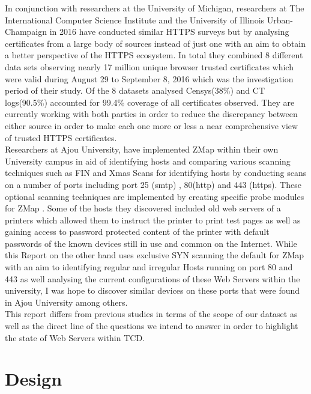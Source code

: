 \documentclass[a4wide,leqno,12pt]{report}
\begin{document}
In conjunction with researchers at the University of Michigan, researchers at The International Computer Science Institute and the University of Illinois Urban-Champaign in 2016 have conducted similar HTTPS surveys but by analysing certificates from a large body of sources instead of just one with an aim to obtain a better perspective of the HTTPS ecosystem. In total they combined 8 different data sets observing nearly 17 million unique browser trusted certificates which were valid during August 29 to September 8, 2016 which was the investigation period of their study. Of the 8 datasets analysed Censys(38\%) and CT logs(90.5\%) accounted for 99.4\% coverage of all certificates observed. They are currently working with both parties in order to reduce the discrepancy between either source in order to make each one more or less a near comprehensive view of trusted HTTPS certificates\cite{vandersloot2016towards}.\\

Researchers at Ajou University, have  implemented ZMap within their own University campus in aid of identifying hosts and comparing various scanning techniques such as FIN and Xmas Scans for identifying hosts by conducting scans on a number of ports including port 25 (smtp) , 80(http) and 443 (https). These optional scanning techniques are implemented by creating specific probe modules for ZMap \cite{lee2016implementation}. Some of the hosts they discovered included old web servers of a printers which allowed them to instruct the printer to print test pages as well as gaining access to  password protected content of the printer with default passwords of the known devices still in use and common on the Internet. While this Report on the other hand uses exclusive SYN scanning the default for ZMap with an aim to identifying regular and irregular Hosts running on port 80 and 443 as well analysing the current configurations of these Web Servers within the university, I was hope to discover similar devices on these ports that were found in Ajou University among others.\\

This report differs from previous studies in terms of the scope of our dataset as well as the direct line of the questions we intend to answer in order to highlight the state of Web Servers within TCD.

\chapter{Design}
\end{document}
